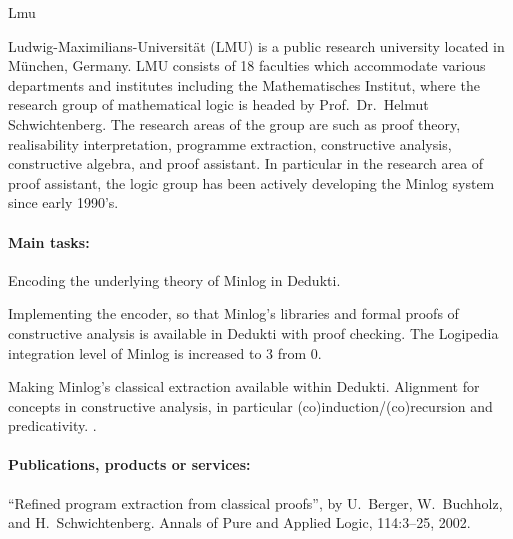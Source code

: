 \begin{sitedescription}{Lmu}

\newcommand\inquotes[1]{``#1''}


Ludwig-Maximilians-Universit\"at (LMU) is a public research university
located in M\"unchen, Germany.  LMU consists of 18 faculties which
accommodate various departments and institutes including the
Mathematisches Institut, where the research group of mathematical
logic is headed by Prof.\ Dr.\ Helmut Schwichtenberg.  The research
areas of the group are such as proof theory, realisability
interpretation, programme extraction, constructive analysis,
constructive algebra, and proof assistant.  In particular in the
research area of proof assistant, the logic group has been actively
developing the Minlog system since early 1990's.

\paragraph*{Main tasks:}

\begin{compactitem}
  \item Encoding the underlying theory of Minlog in Dedukti.  
  \item Implementing the encoder, so that Minlog's libraries and formal proofs of constructive analysis is available in Dedukti with proof checking.
The Logipedia integration level of Minlog is increased to 3 from 0.  
  \item Making Minlog's classical extraction available within Dedukti.  Alignment for concepts in constructive analysis, in particular (co)induction/(co)recursion and predicativity.  .  

\end{compactitem}

\paragraph*{Publications, products or services:}

\begin{compactitem}
\item ``Refined program extraction from classical proofs'',
  by U.~Berger, W.~Buchholz, and H.~Schwichtenberg.
  Annals of Pure and Applied Logic, 114:3--25, 2002.


\end{compactitem}
\end{sitedescription}
